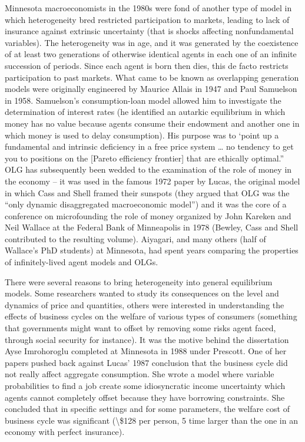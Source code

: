\documentclass[10pt,math=newtx,citestyle=gb7714-2015,bibstyle=gb7714-2015]{elegantbook}
\begin{document}
	Minnesota macroeconomists in the 1980s were fond of another type of model in which heterogeneity bred restricted participation to markets, leading to lack of insurance against extrinsic uncertainty (that is shocks affecting nonfundamental variables). The heterogeneity was in age, and it was generated by the coexistence of at least two generations of otherwise identical agents in each one of an infinite succession of periods. Since each agent is born then dies, this  de facto restricts participation to past markets. What came to be known as overlapping generation models were originally engineered by Maurice Allais in 1947 and Paul Samuelson in 1958. Samuelson’s consumption-loan model allowed him to investigate the determination of interest rates (he identified an autarkic equilibrium in which money has no value because agents consume their endowment and another one in which money is used to delay consumption). His purpose was to ‘point up a fundamental and intrinsic deficiency in a free price system … no tendency to get you to positions on the [Pareto efficiency frontier] that are ethically optimal.” OLG has subsequently been wedded to the examination of the role of money in the economy – it was used in the famous 1972 paper by Lucas, the original model in which Cass and Shell framed their sunspots (they argued that OLG was the “only dynamic disaggregated macroeconomic model”) and it was the core of a conference on microfounding the role of money organized by John Kareken and Neil Wallace at the Federal Bank of Minneapolis in 1978 (Bewley, Cass and Shell contributed to the resulting volume). Aiyagari, and many others (half of Wallace’s PhD students) at Minnesota, had spent years comparing the properties of infinitely-lived agent models and OLGs.
	
	There were several reasons to bring heterogeneity into general equilibrium models. Some researchers wanted to study its consequences on the level and dynamics of price and quantities, others were interested in understanding the effects of business cycles on the welfare of various types of consumers (something that governments might want to offset by removing some risks agent faced, through social security for instance). It was the motive behind the dissertation Ayse Imrohoroglu completed at Minnesota in 1988 under Prescott. One of her papers pushed back against Lucas’ 1987 conclusion that the business cycle did not really affect aggregate consumption. She wrote a model where variable probabilities to find a job create some idiosyncratic income uncertainty which agents cannot completely offset because they have borrowing constraints. She concluded that in specific settings and for some parameters, the welfare cost of business cycle was significant (\textbackslash{}\$128 per person, 5 time larger than the one in an economy with perfect insurance).
	
\end{document}
